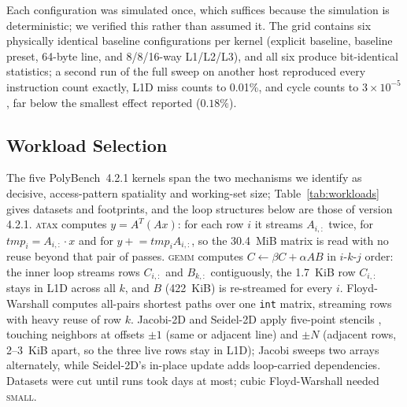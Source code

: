 \documentclass[12pt]{article}
\begin{document}
Each configuration was simulated once, which suffices because the simulation is
deterministic; we verified this rather than assumed it. The grid contains six
physically identical baseline configurations per kernel (explicit baseline,
baseline preset, 64-byte line, and 8/8/16-way L1/L2/L3), and all six produce
bit-identical statistics; a second run of the full sweep on another host
reproduced every instruction count exactly, L1D miss counts to 0.01\%, and
cycle counts to \(3 \times 10^{-5}\), far below the smallest effect reported
(\(0.18\%\)).

\subsection{Workload Selection}\label{sub:workloads}

The five PolyBench~4.2.1 \cite{polybench:2016} kernels span the two mechanisms we
identify as decisive, access-pattern spatiality and working-set size;
Table~\ref{tab:workloads} gives datasets and footprints, and the loop structures
below are those of version 4.2.1.
\textsc{ata}x computes \(y = A^{T}(Ax)\): for each row \(i\)
it streams \(A_{i,:}\) twice, for \(\mathit{tmp}_i = A_{i,:}\cdot x\) and for
\(y \mathrel{+}= \mathit{tmp}_i A_{i,:}\), so the 30.4~MiB matrix is read with no
reuse beyond that pair of passes. \textsc{gemm} computes \(C \leftarrow \beta C +
\alpha AB\) in \(i\)-\(k\)-\(j\) order: the inner loop streams rows \(C_{i,:}\)
and \(B_{k,:}\) contiguously, the 1.7~KiB row \(C_{i,:}\) stays in L1D across all
\(k\), and \(B\) (422~KiB) is re-streamed for every \(i\). Floyd-Warshall
computes all-pairs shortest paths \cite{floyd:1962, warshall:1962} over one
\texttt{int} matrix, streaming rows with heavy reuse of row \(k\). Jacobi-2D and
Seidel-2D apply five-point stencils \cite{golub:2013}, touching neighbors at
offsets \(\pm 1\) (same or adjacent line) and \(\pm N\) (adjacent rows, 2--3~KiB
apart, so the three live rows stay in L1D); Jacobi sweeps two arrays alternately,
while Seidel-2D's in-place update adds loop-carried dependencies. Datasets were
cut until runs took days at most; cubic Floyd-Warshall needed \textsc{small}.
\end{document}

